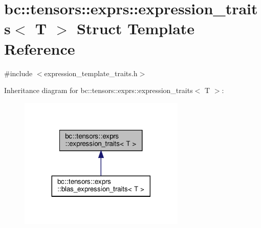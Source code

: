 \hypertarget{structbc_1_1tensors_1_1exprs_1_1expression__traits}{}\section{bc\+:\+:tensors\+:\+:exprs\+:\+:expression\+\_\+traits$<$ T $>$ Struct Template Reference}
\label{structbc_1_1tensors_1_1exprs_1_1expression__traits}


{\ttfamily \#include $<$expression\+\_\+template\+\_\+traits.\+h$>$}



Inheritance diagram for bc\+:\+:tensors\+:\+:exprs\+:\+:expression\+\_\+traits$<$ T $>$\+:\nopagebreak
\begin{figure}[H]
\begin{center}
\leavevmode
\includegraphics[width=224pt]{structbc_1_1tensors_1_1exprs_1_1expression__traits__inherit__graph}
\end{center}
\end{figure}
